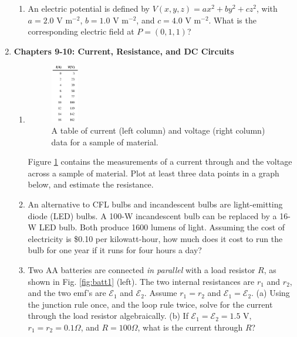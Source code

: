 \documentclass[10pt]{article}
\begin{document}
\begin{enumerate}
\begin{enumerate}
\item An electric potential is defined by $V(x,y,z) = a x^2 + b y^2 + c z^2$, with $a = 2.0$ V m$^{-2}$, $b = 1.0$ V m$^{-2}$, and $c = 4.0$ V m$^{-2}$.  What is the corresponding electric field at $P = (0,1,1)$? \\ \vspace{3.5cm}
\end{enumerate}
\item \textbf{Chapters 9-10: Current, Resistance, and DC Circuits}
\begin{enumerate}
\item
\begin{figure}
\centering
\includegraphics[width=0.12\textwidth]{OhmsTable.png}
\caption{\label{fig:OhmsTable} A table of current (left column) and voltage (right column) data for a sample of material.}
\end{figure} 
Figure \ref{fig:OhmsTable} contains the measurements of a current through and the voltage across a sample of material. Plot at least three data points in a graph below, and estimate the resistance. \\ \vspace{3cm}
\item An alternative to CFL bulbs and incandescent bulbs are light-emitting diode (LED) bulbs. A 100-W incandescent bulb can be replaced by a 16-W LED bulb.  Both produce 1600 lumens of light. Assuming the cost of electricity is \$0.10 per kilowatt-hour, how much does it cost to run the bulb for one year if it runs for four hours a day? \\ \vspace{2cm}
\item Two AA batteries are connected \textit{in parallel} with a load resistor $R$, as shown in Fig. \ref{fig:batt1} (left).  The two internal resistances are $r_1$ and $r_2$, and the two emf's are $\mathcal{E}_1$ and $\mathcal{E}_2$. Assume $r_1 = r_2$ and $\mathcal{E}_1 = \mathcal{E}_2$.  (a) Using the junction rule once, and the loop rule twice, solve for the current through the load resistor algebraically. (b) If  $\mathcal{E}_1 = \mathcal{E}_2 = 1.5$ V, $r_1 = r_2 = 0.1 \Omega$, and $R = 100\Omega$, what is the current through $R$? \\ \vspace{4cm}

\end{enumerate}
\end{enumerate}
\end{document}
